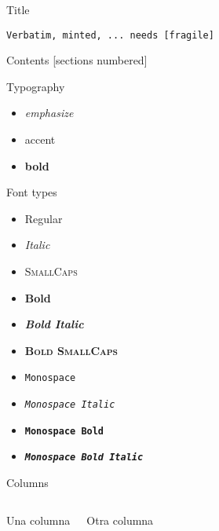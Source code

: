 
\begin{frame}[fragile]{Title}
    \begin{verbatim}Verbatim, minted, ... needs [fragile]\end{verbatim}
\end{frame}

\begin{frame}{Contents}
    [sections numbered]
    \tableofcontents[hideallsubsections]
\end{frame}

\begin{frame}{Typography}
    \begin{itemize}
        \item \emph{emphasize}
        \item \alert{accent}
        \item \textbf{bold}
    \end{itemize}
\end{frame}

\begin{frame}{Font types}
    \begin{itemize}
        \item Regular
        \item \textit{Italic}
        \item \textsc{SmallCaps}
        \item \textbf{Bold}
        \item \textbf{\textit{Bold Italic}}
        \item \textbf{\textsc{Bold SmallCaps}}
        \item \texttt{Monospace}
        \item \texttt{\textit{Monospace Italic}}
        \item \texttt{\textbf{Monospace Bold}}
        \item \texttt{\textbf{\textit{Monospace Bold Italic}}}
    \end{itemize}
\end{frame}

\begin{frame}{Columns}
    \begin{columns}[T,onlytextwidth]
        Una columna

        Otra columna
    \end{columns}
\end{frame}


